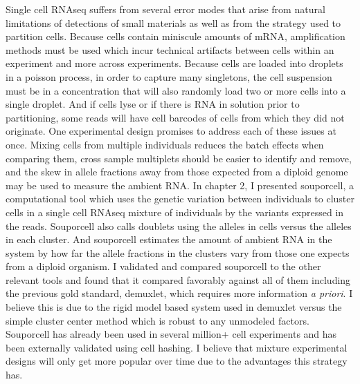 \par{
Single cell RNAseq suffers from several error modes that arise from natural limitations of detections of small materials as well as from the strategy used to partition cells. Because cells contain miniscule amounts of mRNA, amplification methods must be used which incur technical artifacts between cells within an experiment and more across experiments. Because cells are loaded into droplets in a poisson process, in order to capture many singletons, the cell suspension must be in a concentration that will also randomly load two or more cells into a single droplet. And if cells lyse or if there is RNA in solution prior to partitioning, some reads will have cell barcodes of cells from which they did not originate. One experimental design promises to address each of these issues at once. Mixing cells from multiple individuals reduces the batch effects when comparing them, cross sample multiplets should be easier to identify and remove, and the skew in allele fractions away from those expected from a diploid genome may be used to measure the ambient RNA. In chapter 2, I presented souporcell, a computational tool which uses the genetic variation between individuals to cluster cells in a single cell RNAseq mixture of individuals by the variants expressed in the reads. Souporcell also calls doublets using the alleles in cells versus the alleles in each cluster. And souporcell estimates the amount of ambient RNA in the system by how far the allele fractions in the clusters vary from those one expects from a diploid organism. I validated and compared souporcell to the other relevant tools and found that it compared favorably against all of them including the previous gold standard, demuxlet, which requires more information \textit{a priori}. I believe this is due to the rigid model based system used in demuxlet versus the simple cluster center method which is robust to any unmodeled factors. Souporcell has already been used in several million+ cell experiments and has been externally validated using cell hashing. I believe that mixture experimental designs will only get more popular over time due to the advantages this strategy has. 
}

